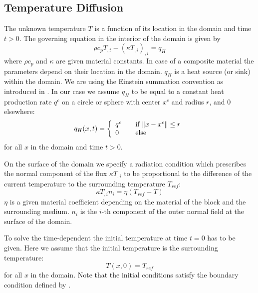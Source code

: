 \subsection{\label{DIFFUSION TEMP SEC}Temperature Diffusion}
The unknown temperature $T$ is a function of its location in the domain and time $t>0$.
The governing equation in the interior of the domain is given by
\begin{equation}
\rho c_p T_{,t} - (\kappa T_{,i})_{,i} = q_H
\label{DIFFUSION TEMP EQ 1}
\end{equation}
where $\rho c_p$ and $\kappa$ are given material constants.
In case of a composite material the parameters depend on their location in the domain.
$q_H$ is a heat source (or sink) within the domain.
We are using the Einstein summation convention as introduced in .
In our case we assume $q_H$ to be equal to a constant heat
production rate $q^{c}$ on a circle or sphere with center $x^c$ and radius $r$, and $0$ elsewhere:
\begin{equation}
q_H(x,t)=\left\{ 
\begin{array}{l l}
    q^c  & \quad\text{if $\|x-x^c\| \le r$}\\
    0    & \quad\text{else}\\
\end{array} \right.
\label{DIFFUSION TEMP EQ 1b}
\end{equation}
for all $x$ in the domain and time $t>0$.

On the surface of the domain we specify a radiation condition which prescribes
the normal component of the flux $\kappa T_{,i}$ to be proportional
to the difference of the current temperature to the surrounding temperature $T_{ref}$:
\begin{equation}
 \kappa T_{,i} n_i = \eta (T_{ref}-T) 
\label{DIFFUSION TEMP EQ 2}
\end{equation}
$\eta$ is a given material coefficient depending on the material of the block and the surrounding medium.
$n_i$ is the $i$-th component of the outer normal field at the surface of the domain. 

To solve the time-dependent  the initial temperature at time $t=0$ has to be given.
Here we assume that the initial temperature is the surrounding temperature:
\begin{equation}
T(x,0)=T_{ref} 
\label{DIFFUSION TEMP EQ 4}
\end{equation}
for all $x$ in the domain. Note that the initial conditions satisfy the
boundary condition defined by . 

